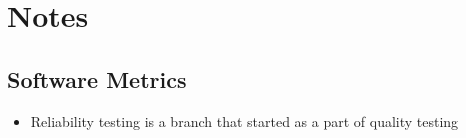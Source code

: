 \chapter{Notes}
\label{chap:notes}

\section{Software Metrics}
\label{chap:notes:sec:software-metrics}

\begin{itemize}
    \item Reliability testing is a branch that started as a part of quality
          testing \cite[p.~18, ch.~10]{fenton_software_1997}
\end{itemize}
